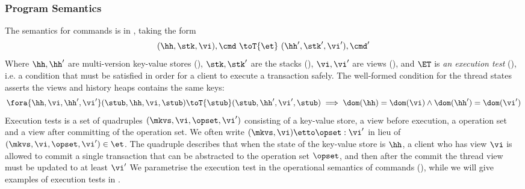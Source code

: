 \subsubsection{Program Semantics}

\label{sec:prog-semantics}
The semantics for commands is in , taking the form
\[
    ( \hh, \stk, \vi ), \cmd \ \toT{\et} \ ( \hh', \stk', \vi' ) , \cmd'
\]
Where \( \hh, \hh' \) are multi-version key-value stores (), \( \stk, \stk'\) are the stacks (), \( \vi, \vi'\) are views (), and $\ET$ is \emph{an execution test} (), i.e. a condition that must be satisfied in order for a client to execute a transaction safely. 
The well-formed condition for the thread states asserts the views and history heaps contains the same keys:
\[
\fora{\hh, \vi, \hh', \vi'} (\stub, \hh, \vi, \stub) \toT{\stub} (\stub, \hh', \vi', \stub)  \implies \dom(\hh) = \dom(\vi) \land \dom(\hh') = \dom(\vi')
\]
Execution tests is a set of quadruples \( (\mkvs, \vi, \opset, \vi') \) consisting of a key-value store, a view before execution, a operation set and a view after committing of the operation set. 
We often write \( (\mkvs, \vi) \etto \opset : \vi'\) in lieu of \( (\mkvs, \vi, \opset, \vi') \in \et\).
The quadruple describes that when the state of the key-value store is \( \hh \), a client who has view \( \vi \) is allowed to commit a single transaction that can be abstracted to the operation set \( \opset \), and then after the commit the thread view must be updated to at least \( \vi' \)
We parametrise the execution test in the operational semantics of commands (), while we will give examples of execution tests in . 

